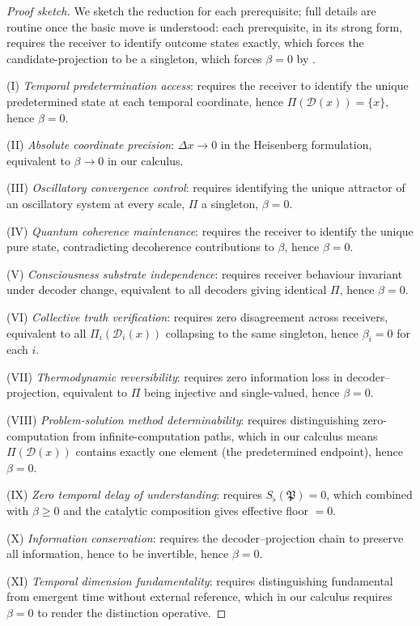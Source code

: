 \documentclass[11pt,twocolumn,a4paper]{article}
\newcommand{\D}{\mathcal{D}}
\newcommand{\Method}{\mathfrak{P}}
\newcommand{\Sfloor}{S_{\flat}}
\begin{document}
\begin{proof}[Proof sketch]
We sketch the reduction for each prerequisite; full details are routine
once the basic move is understood: each prerequisite, in
its strong form, requires the receiver to identify outcome states
exactly, which forces the candidate-projection to be a singleton, which
forces $\beta=0$ by .

(I) \emph{Temporal predetermination access}: requires the receiver to
identify the unique predetermined state at each temporal coordinate,
hence $\Pi(\D(x))=\{x\}$, hence $\beta=0$.

(II) \emph{Absolute coordinate precision}: $\Delta x\to 0$ in the
Heisenberg formulation, equivalent to $\beta\to 0$ in our calculus.

(III) \emph{Oscillatory convergence control}: requires identifying the
unique attractor of an oscillatory system at every scale, $\Pi$ a
singleton, $\beta=0$.

(IV) \emph{Quantum coherence maintenance}: requires the receiver to
identify the unique pure state, contradicting decoherence
contributions to $\beta$, hence $\beta=0$.

(V) \emph{Consciousness substrate independence}: requires receiver
behaviour invariant under decoder change, equivalent to all decoders
giving identical $\Pi$, hence $\beta=0$.

(VI) \emph{Collective truth verification}: requires zero disagreement
across receivers, equivalent to all $\Pi_i(\D_i(x))$ collapsing to
the same singleton, hence $\beta_i=0$ for each $i$.

(VII) \emph{Thermodynamic reversibility}: requires zero information
loss in decoder--projection, equivalent to $\Pi$ being injective and
single-valued, hence $\beta=0$.

(VIII) \emph{Problem-solution method determinability}: requires
distinguishing zero-computation from infinite-computation paths, which
in our calculus means $\Pi(\D(x))$ contains exactly one element
(the predetermined endpoint), hence $\beta=0$.

(IX) \emph{Zero temporal delay of understanding}: requires
$\Sfloor(\Method)=0$, which combined with $\beta\ge 0$ and the
catalytic composition gives effective floor $=0$.

(X) \emph{Information conservation}: requires the decoder--projection
chain to preserve all information, hence to be invertible, hence
$\beta=0$.

(XI) \emph{Temporal dimension fundamentality}: requires distinguishing
fundamental from emergent time without external reference, which in
our calculus requires $\beta=0$ to render the distinction operative.
\end{proof}
\end{document}
